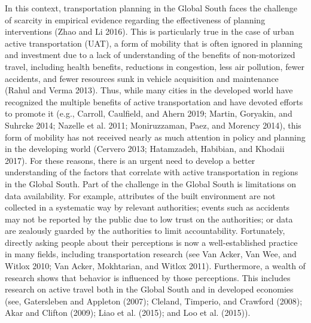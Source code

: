 \documentclass[]{elsarticle} %
\begin{document}
In this context, transportation planning in the Global South faces the
challenge of scarcity in empirical evidence regarding the effectiveness
of planning interventions (Zhao and Li 2016). This is particularly true
in the case of urban active transportation (UAT), a form of mobility
that is often ignored in planning and investment due to a lack of
understanding of the benefits of non-motorized travel, including health
benefits, reductions in congestion, less air pollution, fewer accidents,
and fewer resources sunk in vehicle acquisition and maintenance (Rahul
and Verma 2013). Thus, while many cities in the developed world have
recognized the multiple benefits of active transportation and have
devoted efforts to promote it (e.g., Carroll, Caulfield, and Ahern 2019;
Martin, Goryakin, and Suhrcke 2014; Nazelle et al. 2011; Moniruzzaman,
Paez, and Morency 2014), this form of mobility has not received nearly
as much attention in policy and planning in the developing world
(Cervero 2013; Hatamzadeh, Habibian, and Khodaii 2017). For these
reasons, there is an urgent need to develop a better understanding of
the factors that correlate with active transportation in regions in the
Global South. Part of the challenge in the Global South is limitations
on data availability. For example, attributes of the built environment
are not collected in a systematic way by relevant authorities; events
such as accidents may not be reported by the public due to low trust on
the authorities; or data are zealously guarded by the authorities to
limit accountability. Fortunately, directly asking people about their
perceptions is now a well-established practice in many fields, including
transportation research (see Van Acker, Van Wee, and Witlox 2010; Van
Acker, Mokhtarian, and Witlox 2011). Furthermore, a wealth of research
shows that behavior is influenced by those perceptions. This includes
research on active travel both in the Global South and in developed
economies (see, Gatersleben and Appleton (2007); Cleland, Timperio, and
Crawford (2008); Akar and Clifton (2009); Liao et al. (2015); and Loo et
al. (2015)).
\end{document}
